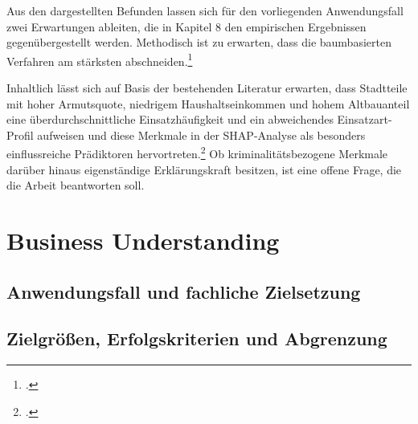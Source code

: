 \documentclass[12pt,a4paper]{article}
\begin{document}

Aus den dargestellten Befunden lassen sich für den vorliegenden Anwendungsfall zwei Erwartungen
ableiten, die in Kapitel 8 den empirischen Ergebnissen gegenübergestellt werden. Methodisch ist zu
erwarten, dass die baumbasierten Verfahren am stärksten abschneiden.\footcite[9]{Grinsztajn2022}

Inhaltlich lässt sich auf Basis der bestehenden Literatur erwarten, dass Stadtteile mit hoher
Armutsquote, niedrigem Haushaltseinkommen und hohem Altbauanteil eine überdurchschnittliche
Einsatzhäufigkeit und ein abweichendes Einsatzart-Profil aufweisen und diese Merkmale in der
SHAP-Analyse als besonders einflussreiche Prädiktoren hervortreten.\footcite[27-28]{Jennings1999}
Ob kriminalitätsbezogene Merkmale darüber hinaus eigenständige Erklärungskraft besitzen, ist eine
offene Frage, die die Arbeit beantworten soll.


\section{Business Understanding}
\subsection{Anwendungsfall und fachliche Zielsetzung}


\subsection{Zielgrößen, Erfolgskriterien und Abgrenzung}
\end{document}

